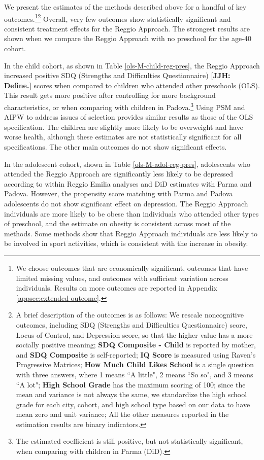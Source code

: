 We present the estimates of the methods described above for a handful of key outcomes.\footnote{We choose outcomes that are economically significant,  outcomes that have limited missing values, and outcomes with sufficient variation across individuals. Results on more outcomes are reported in Appendix \ref{appsec:extended-outcome}.}\footnote{A brief description of the outcomes is as follows: We rescale noncognitive outcomes, including SDQ (Strengths and Difficulties Questionnaire) score, Locus of Control, and Depression score, so that the higher value has a more socially positive meaning; \textbf{SDQ Composite - Child} is reported by mother, and \textbf{SDQ Composite} is self-reported; \textbf{IQ Score} is measured using Raven's Progressive Matrices; \textbf{How Much Child Likes School} is a single question with three answers, where 1 means ``A little", 2 means ``So so", and 3 means ``A lot";  \textbf{High School Grade} has the maximum scoring of 100; since the mean and variance is not always the same, we standardize the high school grade for each city, cohort, and high school type based on our data to have mean zero and unit variance; All the other measures reported in the estimation results are binary indicators.} Overall, very few outcomes show statistically significant and consistent treatment effects for the Reggio Approach. The strongest results are shown when we compare the Reggio Approach with no preschool for the age-40 cohort.

In the child cohort, as shown in Table \ref{ols-M-child-reg-pres}, the Reggio Approach increased positive SDQ (Strengths and Difficulties Questionnaire) \textbf{[JJH: Define.]} scores when compared to children who attended other preschools (OLS). This result gets more positive after controlling for more background characteristics, or when comparing with children in Padova.\footnote{The estimated coefficient is still positive, but not statistically significant, when comparing with children in Parma (DiD).} Using PSM and AIPW to address issues of selection provides similar results as those of the OLS specification. The children are slightly more likely to be overweight and have worse health, although these estimates are not statistically significant for all specifications. The other main outcomes do not show significant effects.

In the adolescent cohort, shown in Table \ref{ols-M-adol-reg-pres}, adolescents who attended the Reggio Approach are significantly less likely to be depressed according to within Reggio Emilia analyses and DiD estimates with Parma and Padova. However, the propensity score matching with Parma and Padova adolescents do not show significant effect on depression. The Reggio Approach individuals are more likely to be obese than individuals who attended other types of preschool, and the estimate on obesity is consistent across most of the methods. Some methods show that Reggio Approach individuals are less likely to be involved in sport activities, which is consistent with the increase in obesity.

